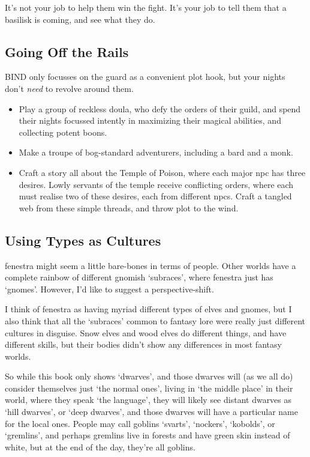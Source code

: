 \begin{multicols}{2}
It's not your job to help them win the fight.
It's your job to tell them that a basilisk is coming, and see what they do.

\subsection{Going Off the Rails}

BIND only focusses on the \gls{guard} as a convenient plot hook, but your nights don't \emph{need} to revolve around them.

\begin{itemize}
  \item
  Play a group of reckless doula, who defy the orders of their guild, and spend their nights focussed intently in maximizing their magical abilities, and collecting potent \glspl{boon}.
  \item
  Make a troupe of bog-standard adventurers, including a bard and a monk.
  \item
  Craft a story all about the Temple of Poison, where each major \gls{npc} has three desires.
  Lowly servants of the temple receive conflicting orders, where each must realise two of these desires, each from different \glspl{npc}.
  Craft a tangled web from these simple threads, and throw plot to the wind.
\end{itemize}

\subsection{Using Types as Cultures}

\Gls{fenestra} might seem a little bare-bones in terms of people.
Other worlds have a complete rainbow of different gnomish `subraces', where \gls{fenestra} just has `gnomes'.
However, I'd like to suggest a perspective-shift.

I think of \gls{fenestra} as having myriad different types of elves and gnomes, but I also think that all the `subraces' common to fantasy lore were really just different cultures in disguise.
Snow elves and wood elves do different things, and have different skills, but their bodies didn't show any differences in most fantasy worlds.

So while this book only shows `dwarves', and those dwarves will (as we all do) consider themselves just `the normal ones', living in `the middle place' in their world, where they speak `the language', they will likely see distant dwarves as `hill dwarves', or `deep dwarves', and those dwarves will have a particular name for the local ones.
People may call goblins `svarts', `nockers', `kobolds', or `gremlins', and perhaps gremlins live in forests and have green skin instead of white, but at the end of the day, they're all goblins.


\end{multicols}
